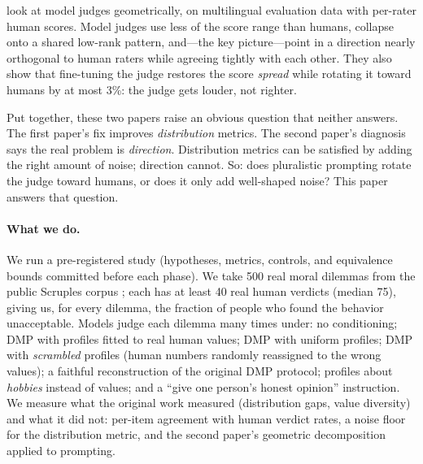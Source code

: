 \documentclass{article}
\begin{document}
\citet{mukherjee2026geometry} look at model judges geometrically, on multilingual evaluation data with per-rater human scores. Model judges use less of the score range than humans, collapse onto a shared low-rank pattern, and---the key picture---point in a direction nearly orthogonal to human raters while agreeing tightly with each other. They also show that fine-tuning the judge restores the score \emph{spread} while rotating it toward humans by at most 3\%: the judge gets louder, not righter.

Put together, these two papers raise an obvious question that neither answers. The first paper's fix improves \emph{distribution} metrics. The second paper's diagnosis says the real problem is \emph{direction}. Distribution metrics can be satisfied by adding the right amount of noise; direction cannot. So: does pluralistic prompting rotate the judge toward humans, or does it only add well-shaped noise? This paper answers that question.

\paragraph{What we do.} We run a pre-registered study (hypotheses, metrics, controls, and equivalence bounds committed before each phase). We take 500 real moral dilemmas from the public Scruples corpus \citep{lourie2021scruples}; each has at least 40 real human verdicts (median 75), giving us, for every dilemma, the fraction of people who found the behavior unacceptable. Models judge each dilemma many times under: no conditioning; DMP with profiles fitted to real human values; DMP with uniform profiles; DMP with \emph{scrambled} profiles (human numbers randomly reassigned to the wrong values); a faithful reconstruction of the original DMP protocol; profiles about \emph{hobbies} instead of values; and a ``give one person's honest opinion'' instruction. We measure what the original work measured (distribution gaps, value diversity) and what it did not: per-item agreement with human verdict rates, a noise floor for the distribution metric, and the second paper's geometric decomposition applied to prompting.
\end{document}
